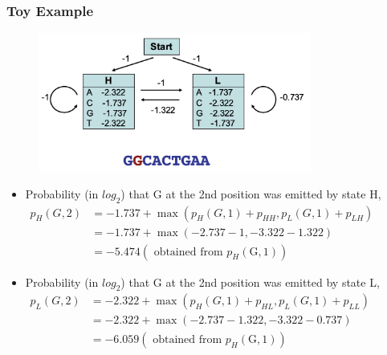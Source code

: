 \documentclass{beamer}
\begin{document}
\begin{frame}
    \frametitle{Toy Example}
    
    \begin{figure}[T]
        \includegraphics[width=0.8\textwidth]{img/11.png}
        \end{figure}
        \begin{itemize}
            \footnotesize
            \item         Probability (in $log_2$) that G at the 2nd position was emitted by state H, $
        \begin{aligned} p_{H}(G, 2) &=-1.737+\max \left(p_{H}(G, 1)+p_{H H}, p_{L}(G, 1)+p_{L H}\right) \\ &=-1.737+\max (-2.737-1,-3.322-1.322) \\ &=-5.474\left(\text { obtained from } p_{H}(\mathrm{G}, 1)\right) \end{aligned}
        $
            \item         Probability (in $log_2$) that G at the 2nd position was emitted by state L, $
        \begin{aligned} p_{L}(G, 2) &=-2.322+\max \left(p_{H}(G, 1)+p_{H L}, p_{L}(G, 1)+p_{L L}\right) \\ &=-2.322+\max (-2.737-1.322,-3.322-0.737) \\ &=-6.059\left(\text { obtained from } p_{H}(\mathrm{G}, 1)\right) \end{aligned}
        $
        \end{itemize}

    \end{frame}
\end{document}

